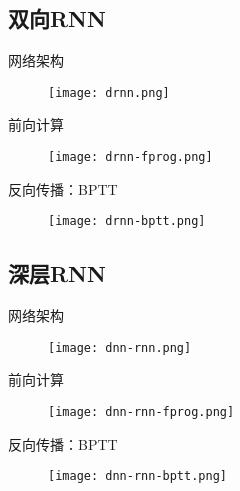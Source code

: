 \subsection{双向RNN}

\begin{frame}[fragile]{网络架构}
  \begin{figure}
    \centering
    \texttt{[image: drnn.png]}
  \end{figure}
\end{frame}

\begin{frame}[fragile]{前向计算}
  \begin{figure}
    \centering
    \texttt{[image: drnn-fprog.png]}
  \end{figure}
\end{frame}

\begin{frame}[fragile]{反向传播：BPTT}
  \begin{figure}
    \centering
    \texttt{[image: drnn-bptt.png]}
  \end{figure}
\end{frame}

\subsection{深层RNN}

\begin{frame}[fragile]{网络架构}
  \begin{figure}
    \centering
    \texttt{[image: dnn-rnn.png]}
  \end{figure}
\end{frame}

\begin{frame}[fragile]{前向计算}
  \begin{figure}
    \centering
    \texttt{[image: dnn-rnn-fprog.png]}
  \end{figure}
\end{frame}

\begin{frame}[fragile]{反向传播：BPTT}
  \begin{figure}
    \centering
    \texttt{[image: dnn-rnn-bptt.png]}
  \end{figure}
\end{frame}

